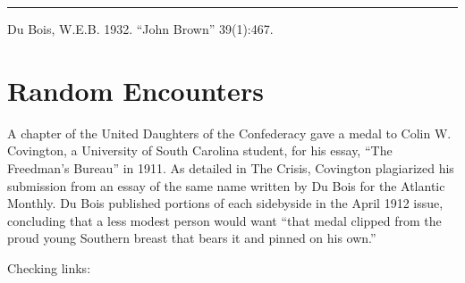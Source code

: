 \documentclass[letterpaper,10pt,english]{jupyterBook}
\begin{document}
\bigskip\hrule\bigskip


\sphinxAtStartPar
{} Du Bois, W.E.B. 1932. “John Brown” 39(1):467.


\chapter{Random Encounters}
\label{\detokenize{random:random-encounters}}\label{\detokenize{random::doc}}
\sphinxAtStartPar
A chapter of the United Daughters of the Confederacy gave a medal to Colin W. Covington, a University of South Carolina student, for his essay, “The Freedman’s Bureau” in 1911. As detailed in The Crisis, Covington plagiarized his submission from an essay of the same name written by Du Bois for the Atlantic Monthly. Du Bois published portions of each side\sphinxhyphen{}by\sphinxhyphen{}side in the April 1912 issue, concluding that a less modest person would want “that medal clipped from the proud young Southern breast that bears it and pinned on his own.”

\sphinxAtStartPar
Checking links:
{\hyperref[\detokenize{Volumes/24/02/whitecharity::doc}]{}}







\renewcommand{\indexname}{Index}
\printindex
\end{document}
